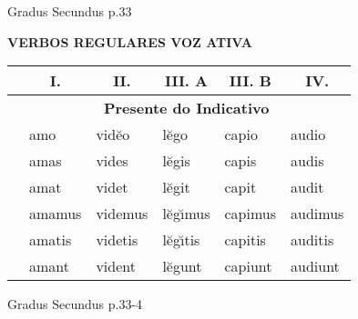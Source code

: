 \documentclass[12pt, oneside, a4paper, article]{article}
\begin{document}
\clearpage
Gradus Secundus p.33

\begin{table}[!hb]
\centering
\textbf{VERBOS REGULARES VOZ ATIVA} 
\vspace{1 ex}

\begin{tabular}{|l|l|l|l|l|l|} 
\hline \hline
& \multicolumn{1}{c|}{I.} & \multicolumn{1}{c|}{II.} & \multicolumn{1}{c|}{III. A} & \multicolumn{1}{c|}{III. B} & \multicolumn{1}{c|}{IV.}  \\
\hline
& \multicolumn{5}{c|}{\textbf{Presente do Indicativo}} \\
\hline
 & amo    & vid\u{e}o & l\u{e}go         & capio   & audio   \\ 
 & amas   & vides     & l\u{e}gis        & capis   & audis   \\ 
 & amat   & videt     & l\u{e}git        & capit   & audit   \\ \hline
 & amamus & videmus   & l\u{e}g\u{\i}mus & capimus & audimus \\ 
 & amatis & videtis   & l\u{e}g\u{\i}tis & capitis & auditis \\ 
 & amant  & vident    & l\u{e}gunt       & capiunt & audiunt \\ 
\hline \hline
\end{tabular}
\end{table}

\clearpage
Gradus Secundus p.33-4
\end{document}
